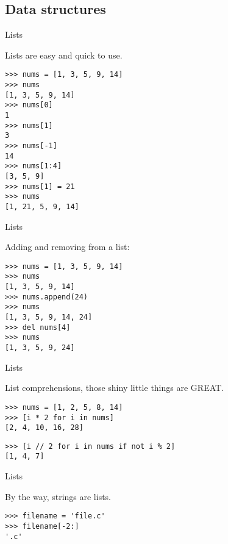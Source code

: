 \documentclass[ignorenonframetext,]{beamer}
\begin{document}
\subsection{Data structures}
\begin{frame}[fragile]{Lists}

    Lists are easy and quick to use.

    \begin{tcolorbox}
    \begin{verbatim}
>>> nums = [1, 3, 5, 9, 14]
>>> nums
[1, 3, 5, 9, 14]
>>> nums[0]
1
>>> nums[1]
3
>>> nums[-1]
14
>>> nums[1:4]
[3, 5, 9]
>>> nums[1] = 21
>>> nums
[1, 21, 5, 9, 14]
    \end{verbatim}
    \end{tcolorbox}
\end{frame}

\begin{frame}[fragile]{Lists}

    Adding and removing from a list:

    \begin{tcolorbox}
    \begin{verbatim}
>>> nums = [1, 3, 5, 9, 14]
>>> nums
[1, 3, 5, 9, 14]
>>> nums.append(24)
>>> nums
[1, 3, 5, 9, 14, 24]
>>> del nums[4]
>>> nums
[1, 3, 5, 9, 24]
    \end{verbatim}
    \end{tcolorbox}
\end{frame}

\begin{frame}[fragile]{Lists}

    List comprehensions, those shiny little things are GREAT.

    \begin{tcolorbox}
    \begin{verbatim}
>>> nums = [1, 2, 5, 8, 14]
>>> [i * 2 for i in nums]
[2, 4, 10, 16, 28]
    \end{verbatim}
    \end{tcolorbox}

    \pause
    \begin{tcolorbox}
    \begin{verbatim}
>>> [i // 2 for i in nums if not i % 2]
[1, 4, 7]
    \end{verbatim}
    \end{tcolorbox}
\end{frame}

\begin{frame}[fragile]{Lists}

    By the way, strings are lists.

    \begin{tcolorbox}
    \begin{verbatim}
>>> filename = 'file.c'
>>> filename[-2:]
'.c'
    \end{verbatim}
    \end{tcolorbox}
\end{frame}
\end{document}
